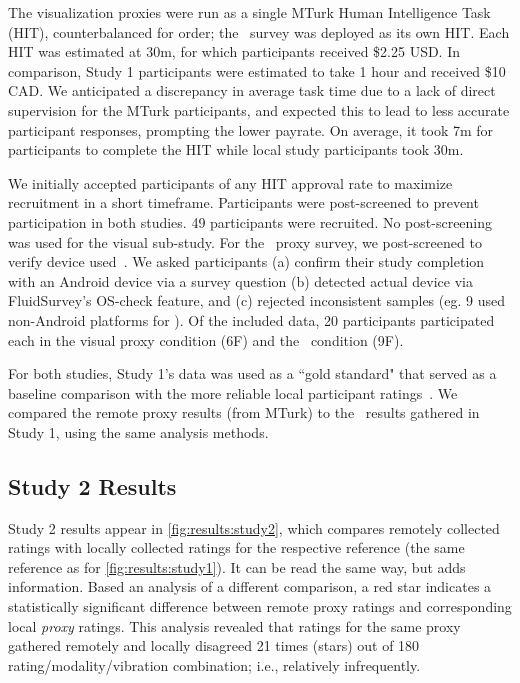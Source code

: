 The visualization proxies were run as a single MTurk Human Intelligence Task (HIT), counterbalanced for order; the \lofi\ survey was deployed as its own HIT.
Each HIT was estimated at 30m, for which participants received \$2.25 USD. In comparison, Study 1 participants were estimated to take 1 hour and received \$10 CAD. 
We anticipated a discrepancy in average task time due to a lack of direct supervision for the MTurk participants, and expected this to lead to less accurate participant responses, prompting the lower payrate.
On average, it took 7m for participants to complete the HIT while local study participants took 30m.

We initially accepted participants of any HIT approval rate to maximize recruitment in a short timeframe. Participants were post-screened to prevent participation in both studies. 49 participants were recruited. 
%
No post-screening was used for the visual sub-study.
For the \lofi~proxy survey, we post-screened
to verify device used~\cite{behavioralturk}. 
We asked participants (a) confirm their study completion with an Android device via a survey question (b) detected actual device via FluidSurvey's OS-check feature, and (c) rejected inconsistent samples (eg. 9 used non-Android platforms for \lofi). 
Of the included data, 20 participants participated each in the visual proxy condition (6F) and the \lofi~condition (9F).

For both studies, Study 1's data was used as a ``gold standard" that served as a baseline comparison with the more reliable local participant ratings~\cite{Amazon.comInc.2015}.
%
We compared the remote proxy results (from MTurk) to the \hifi~results gathered in Study 1, using the same analysis methods.



\subsection{Study 2 Results}
Study 2 results appear in \autoref{fig:results:study2},
which compares remotely collected ratings with locally collected ratings for the respective reference (the same reference as for \autoref{fig:results:study1}). It can be read the same way, but adds information.
Based an analysis of a different comparison, a red star indicates a statistically significant difference between remote proxy ratings and corresponding local \textit{proxy} ratings.
This analysis revealed that ratings for the same proxy gathered remotely and locally disagreed 21 times (stars) out of 180 rating/modality/vibration combination; i.e., relatively infrequently.

